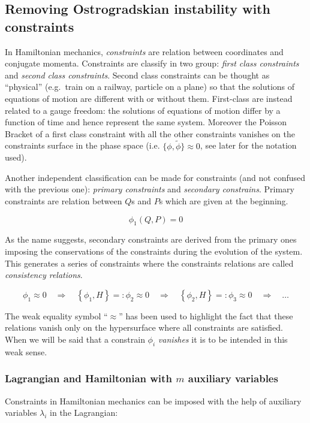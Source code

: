 \subsection{Removing Ostrogradskian instability with constraints}

In Hamiltonian mechanics, \emph{constraints} are relation between coordinates
and conjugate momenta. Constraints are classify in two group: \emph{first class
constraints} and \emph{second class constraints}. Second class constraints can
be thought as ``physical'' (e.g.\ train on a railway, particle on a plane) so
that the solutions of equations of motion are different with or without them.
First-class are instead related to a gauge freedom: the solutions of equations
of motion differ by a function of time and hence represent the same system.
Moreover the Poisson Bracket of a first class constraint with all the other
constraints vanishes on the constraints surface in the phase space (i.e.
$\{\phi, \tilde{\phi}\} \approx 0$, see later for the notation used).


Another independent classification can be made for constraints (and not confused
with the previous one): \emph{primary constraints} and \emph{secondary
constrains}. Primary constraints are relation between $Q$s and $P$s which are
given at the beginning.

\begin{equation} \label{eq:constraint}
  \phi_1(Q, P) = 0
\end{equation}

As the name suggests, secondary constraints are derived from the primary ones
imposing the conservations of the constraints during the evolution of the
system. This generates a series of constraints where the constraints relations
are called \emph{consistency relations}.

\begin{equation} \label{eq:consistency_relations}
  \phi_1 \approx 0 \quad \Rightarrow \quad
  \left\{ \phi_1 , H \right\} =: \phi_2 \approx 0 \quad \Rightarrow \quad
  \left\{ \phi_2 , H \right\} =: \phi_3 \approx 0 \quad \Rightarrow \quad
  \ldots
\end{equation}

The weak equality symbol ``$\approx$'' has been used to highlight the fact that
these relations vanish only on the hypersurface where all constraints are
satisfied. When we will be said that a constrain $\phi_i$ \emph{vanishes} it is
to be intended in this weak sense.

\subsubsection{Lagrangian and Hamiltonian with $m$ auxiliary variables}
Constraints in Hamiltonian mechanics can be imposed with the help of auxiliary
variables $\lambda_i$ in the Lagrangian:

